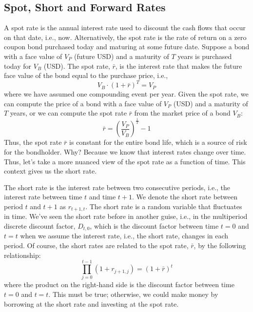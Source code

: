 \documentclass[11pt]{article}
\theoremstyle{definition}
\begin{document}
\subsection{Spot, Short and Forward Rates}
A spot rate is the annual interest rate used to discount the cash flows that occur on that date, i.e., now. Alternatively, the spot rate is the rate of return on a zero coupon bond purchased today and maturing at some future date. Suppose a bond with a face value of $V_{P}$ (future USD) and a maturity of $T$ years is purchased today for $V_{B}$ (USD). The spot rate, $\bar{r}$, is the interest rate that makes the future face value of the bond equal to the purchase price, i.e.,
\begin{equation}
V_{B}\cdot(1+\bar{r})^{T} = V_{P}
\end{equation}
where we have assumed one compounding event per year. Given the spot rate, we can compute the price of a bond with a face value of $V_{P}$ (USD) and a maturity of $T$ years, or we can compute the spot rate $\bar{r}$ from the market price of a bond $V_{B}$:
\begin{equation}
\bar{r} = \left(\frac{V_{P}}{V_{B}}\right)^{\frac{1}{T}}-1
\end{equation}
Thus, the spot rate $\bar{r}$ is constant for the entire bond life, which is a source of risk for the bondholder.
Why? Because we know that interest rates change over time. Thus, let's take a more nuanced view of the spot rate as a function of time. This context gives us the short rate.

The short rate is the interest rate between two consecutive periods, i.e., the interest rate between time $t$ and time $t+1$. We denote the short rate between period $t$ and $t+1$ as $r_{t+1,t}$. The short rate is a random variable that fluctuates in time. We've seen the short rate before in another guise, i.e., in the multiperiod discrete discount factor, $D_{t,0}$, which is the discount factor between time $t = 0$ and $t = t$ when we assume the 
interest rate, i.e., the short rate, changes in each period. Of course, the short rates are related to the spot rate, $\bar{r}$, by the following relationship:
\begin{equation}
\prod_{j=0}^{t-1}\left(1+r_{j+1,j}\right) = \left(1+\bar{r}\right)^{t}
\end{equation}
where the product on the right-hand side is the discount factor between time $t = 0$ and $t = t$.
This must be true; otherwise, we could make money by borrowing at the short rate and investing at the spot rate.
\end{document}
